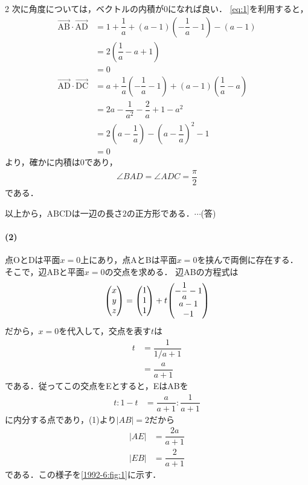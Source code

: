 \documentclass[../../main.tex]{subfiles}
\begin{document}
\begin{multicols}{2}
  次に角度については，ベクトルの内積が$0$になれば良い．
  \cref{eq:1}を利用すると，
  \begin{align}
    \overrightarrow{\text{AB}} \cdot \overrightarrow{\text{AD}}
    & = 1+\dfrac{1}{a} + (a-1)\left(-\dfrac{1}{a}-1\right) -(a-1)                    \\
    & = 2\left(\dfrac{1}{a}-a+1\right)                                              \\
    & = 0                                                                          \\
    \overrightarrow{\text{AD}} \cdot \overrightarrow{\text{DC}} & = a + \dfrac{1}{a}\left(-\dfrac{1}{a}-1\right)+(a-1)\left(\dfrac{1}{a}-a\right) \\
    & = 2a - \dfrac{1}{a^2} - \dfrac{2}{a} +1 -a^2                                   \\
    & = 2\left(a-\dfrac{1}{a}\right) - \left(a-\dfrac{1}{a}\right)^2 -1              \\
    & = 0
  \end{align}
  より，確かに内積は$0$であり，
  \begin{align}
    \angle BAD = \angle ADC = \dfrac{\pi}{2}
  \end{align}
  である．

  以上から，$\text{ABCD}$は一辺の長さ$2$の正方形である．$\cdots$(答)

  \paragraph{(2)}
  点OとDは平面$x=0$上にあり，点AとBは平面$x=0$を挟んで両側に存在する．
  そこで，辺ABと平面$x=0$の交点を求める．
  辺ABの方程式は
  \begin{align}
    \mqty(x \\ y \\ z) = \mqty(1 \\ 1 \\ 1) + t \mqty(-\dfrac{1}{a}-1 \\ a-1 \\ -1)
  \end{align}
  だから，$x=0$を代入して，交点を表す$t$は
  \begin{align}
    t
    & = \dfrac{1}{1/a+1} \\
    & = \dfrac{a}{a+1}
  \end{align}
  である．従ってこの交点をEとすると，EはABを
  \begin{align}
    t: 1-t & = \dfrac{a}{a+1}: \dfrac{1}{a+1}
  \end{align}
  に内分する点であり，(1)より$|AB|=2$だから
  \begin{align}
    |AE| & = \dfrac{2a}{a+1} \\
    |EB| & = \dfrac{2}{a+1}
  \end{align}
  である．この様子を\cref{1992-6:fig:1}に示す．


\end{multicols}
\end{document}
